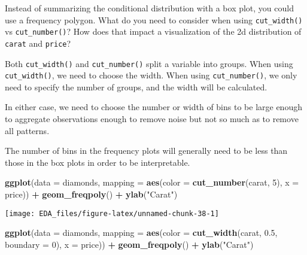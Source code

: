\documentclass[]{book}
\newenvironment{Shaded}{\begin{snugshade}}{\end{snugshade}}
\newcommand{\DataTypeTok}[1]{\textcolor[rgb]{0.13,0.29,0.53}{#1}}
\newcommand{\DecValTok}[1]{\textcolor[rgb]{0.00,0.00,0.81}{#1}}
\newcommand{\FloatTok}[1]{\textcolor[rgb]{0.00,0.00,0.81}{#1}}
\newcommand{\KeywordTok}[1]{\textcolor[rgb]{0.13,0.29,0.53}{\textbf{#1}}}
\newcommand{\NormalTok}[1]{#1}
\newcommand{\OperatorTok}[1]{\textcolor[rgb]{0.81,0.36,0.00}{\textbf{#1}}}
\newcommand{\StringTok}[1]{\textcolor[rgb]{0.31,0.60,0.02}{#1}}
\theoremstyle{plain}
\theoremstyle{remark}
\begin{document}
Instead of summarizing the conditional distribution with a box plot, you
could use a frequency polygon. What do you need to consider when using
\texttt{cut\_width()} vs \texttt{cut\_number()}? How does that impact a
visualization of the 2d distribution of \texttt{carat} and
\texttt{price}?

Both \texttt{cut\_width()} and \texttt{cut\_number()} split a variable
into groups. When using \texttt{cut\_width()}, we need to choose the
width. When using \texttt{cut\_number()}, we only need to specify the
number of groups, and the width will be calculated.

In either case, we need to choose the number or width of bins to be
large enough to aggregate observations enough to remove noise but not so
much as to remove all patterns.

The number of bins in the frequency plots will generally need to be less
than those in the box plots in order to be interpretable.

\begin{Shaded}
\begin{Highlighting}[]
\KeywordTok{ggplot}\NormalTok{(}\DataTypeTok{data =}\NormalTok{ diamonds,}
       \DataTypeTok{mapping =} \KeywordTok{aes}\NormalTok{(}\DataTypeTok{color =} \KeywordTok{cut_number}\NormalTok{(carat, }\DecValTok{5}\NormalTok{), }\DataTypeTok{x =}\NormalTok{ price)) }\OperatorTok{+}
\StringTok{  }\KeywordTok{geom_freqpoly}\NormalTok{() }\OperatorTok{+}
\StringTok{  }\KeywordTok{ylab}\NormalTok{(}\StringTok{"Carat"}\NormalTok{)}
\end{Highlighting}
\end{Shaded}

\begin{center}\texttt{[image: EDA\_files/figure-latex/unnamed-chunk-38-1]} \end{center}

\begin{Shaded}
\begin{Highlighting}[]
\KeywordTok{ggplot}\NormalTok{(}\DataTypeTok{data =}\NormalTok{ diamonds,}
       \DataTypeTok{mapping =} \KeywordTok{aes}\NormalTok{(}\DataTypeTok{color =} \KeywordTok{cut_width}\NormalTok{(carat, }\FloatTok{0.5}\NormalTok{, }\DataTypeTok{boundary =} \DecValTok{0}\NormalTok{), }\DataTypeTok{x =}\NormalTok{ price)) }\OperatorTok{+}
\StringTok{  }\KeywordTok{geom_freqpoly}\NormalTok{() }\OperatorTok{+}
\StringTok{  }\KeywordTok{ylab}\NormalTok{(}\StringTok{"Carat"}\NormalTok{)}
\end{Highlighting}
\end{Shaded}
\end{document}
